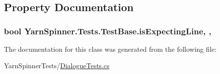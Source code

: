 \subsection{Property Documentation}
\hypertarget{a00144_a47f35b8e8123ed9471883d02b8bc9f3e}{
\subsubsection[{is\-Expecting\-Line}]{\setlength{\rightskip}{0pt plus 5cm}bool Yarn\-Spinner.\-Tests.\-Test\-Base.\-is\-Expecting\-Line\hspace{0.3cm}{\ttfamily [get]}, {\ttfamily [protected]}, {\ttfamily [inherited]}}}\label{a00144_a47f35b8e8123ed9471883d02b8bc9f3e}


The documentation for this class was generated from the following file\-:\begin{DoxyCompactItemize}
\item 
Yarn\-Spinner\-Tests/\hyperlink{a00275}{Dialogue\-Tests.\-cs}\end{DoxyCompactItemize}
